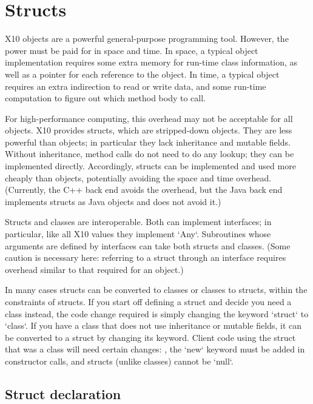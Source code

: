 \chapter{Structs}
\label{XtenStructs}
\label{StructClasses}
\label{Structs}


X10 objects are a powerful general-purpose programming tool. However, the
power must be paid for in space and time. In space, a typical object
implementation requires some extra memory for run-time class information, as
well as a pointer for each reference to the object. In time, a typical object
requires an extra indirection to read or write data, and some run-time
computation to figure out which method body to call.

For high-performance computing, this overhead may not be acceptable for all
objects. X10 provides structs, which are stripped-down objects. They are less
powerful than objects; in particular they lack inheritance and mutable fields.
Without inheritance, method calls do not need to do any lookup; they can be
implemented directly. Accordingly, structs can be implemented and used more
cheaply than objects, potentially avoiding the space and time overhead.
(Currently, the C++ back end avoids the overhead, but the Java back end
implements structs as Java objects and does not avoid it.)



Structs and classes are interoperable. Both can implement interfaces; in
particular, like all X10 values they implement \xcd`Any`.  Subroutines 
whose arguments are defined by interfaces can take both structs and classes.
(Some caution is necessary here: referring to a struct through an interface
requires overhead similar to that required for an object.)



In many cases structs can be converted to classes or classes to structs,
within the constraints of structs. If you start off defining a struct and
decide you need a class instead, the code change required is simply changing
the keyword \xcd`struct` to \xcd`class`. If you have a class that does not use
inheritance or mutable fields, it can be converted to a struct by changing its
keyword. Client code using the struct that was a class will need certain
changes: \eg, the \xcd`new` keyword must be added in constructor calls, and
structs (unlike classes) cannot be \xcd`null`.    





\section{Struct declaration}

